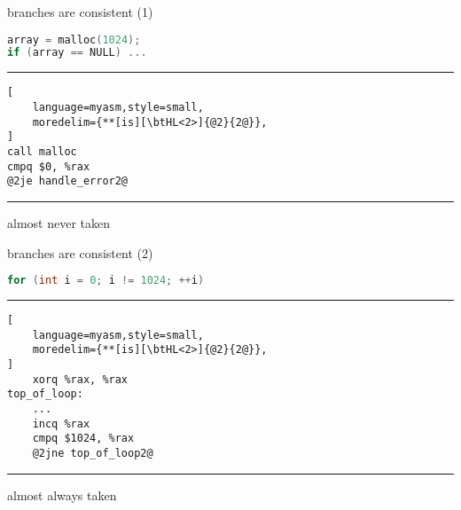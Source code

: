 \begin{frame}[fragile,label=branchSameError]{branches are consistent (1)}
\begin{lstlisting}[language=C,style=small]
array = malloc(1024);
if (array == NULL) ...
\end{lstlisting}
\hrule
\begin{lstlisting}[
    language=myasm,style=small,
    moredelim={**[is][\btHL<2>]{@2}{2@}},
]
call malloc
cmpq $0, %rax
@2je handle_error2@
\end{lstlisting}
\hrule
almost never taken
\end{frame}

\begin{frame}[fragile,label=branchSameLoop]{branches are consistent (2)}
\begin{lstlisting}[language=C,style=small]
for (int i = 0; i != 1024; ++i)
\end{lstlisting}
\hrule
\begin{lstlisting}[
    language=myasm,style=small,
    moredelim={**[is][\btHL<2>]{@2}{2@}},
]
    xorq %rax, %rax
top_of_loop:
    ...
    incq %rax
    cmpq $1024, %rax
    @2jne top_of_loop2@
\end{lstlisting}
\hrule
almost always taken
\end{frame}
